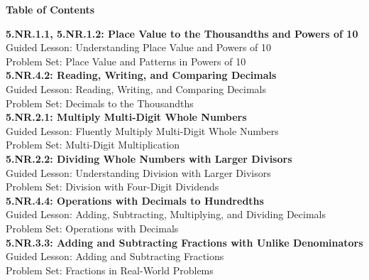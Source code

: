 \documentclass[12pt]{book}
\begin{document}
\begin{center}
    {\LARGE \textbf{Table of Contents}}\\[0.5cm]
\end{center}

\noindent
\textbf{5.NR.1.1, 5.NR.1.2: Place Value to the Thousandths and Powers of 10}\\
\hspace*{2em} Guided Lesson: Understanding Place Value and Powers of 10\\
\hspace*{2em} Problem Set: Place Value and Patterns in Powers of 10\\[0.3cm]

\textbf{5.NR.4.2: Reading, Writing, and Comparing Decimals}\\
\hspace*{2em} Guided Lesson: Reading, Writing, and Comparing Decimals\\
\hspace*{2em} Problem Set: Decimals to the Thousandths\\[0.3cm]

\textbf{5.NR.2.1: Multiply Multi-Digit Whole Numbers}\\
\hspace*{2em} Guided Lesson: Fluently Multiply Multi-Digit Whole Numbers\\
\hspace*{2em} Problem Set: Multi-Digit Multiplication\\[0.3cm]

\textbf{5.NR.2.2: Dividing Whole Numbers with Larger Divisors}\\
\hspace*{2em} Guided Lesson: Understanding Division with Larger Divisors\\
\hspace*{2em} Problem Set: Division with Four-Digit Dividends\\[0.3cm]

\textbf{5.NR.4.4: Operations with Decimals to Hundredths}\\
\hspace*{2em} Guided Lesson: Adding, Subtracting, Multiplying, and Dividing Decimals\\
\hspace*{2em} Problem Set: Operations with Decimals\\[0.3cm]

\textbf{5.NR.3.3: Adding and Subtracting Fractions with Unlike Denominators}\\
\hspace*{2em} Guided Lesson: Adding and Subtracting Fractions\\
\hspace*{2em} Problem Set: Fractions in Real-World Problems\\[0.3cm]

\end{document}
